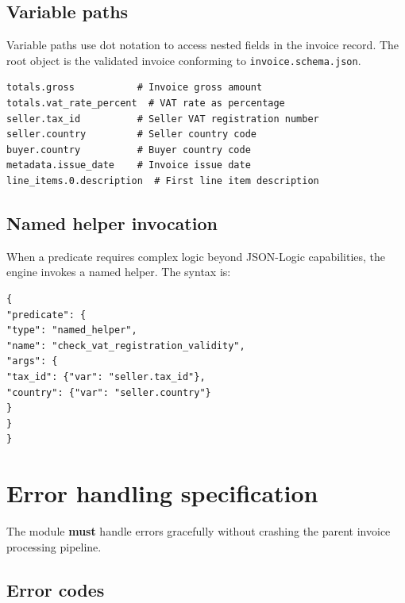 \documentclass[11pt,a4paper,twoside]{report}
\begin{document}
\subsection{Variable paths}

Variable paths use dot notation to access nested fields in the invoice record.
The root object is the validated invoice conforming to
\texttt{invoice.schema.json}.

\begin{lstlisting}[basicstyle=\ttfamily\small,caption={Example variable paths for invoice data.}]
totals.gross           # Invoice gross amount
totals.vat_rate_percent  # VAT rate as percentage
seller.tax_id          # Seller VAT registration number
seller.country         # Seller country code
buyer.country          # Buyer country code
metadata.issue_date    # Invoice issue date
line_items.0.description  # First line item description
\end{lstlisting}

\subsection{Named helper invocation}

When a predicate requires complex logic beyond JSON-Logic capabilities,
the engine invokes a named helper. The syntax is:

\begin{lstlisting}[basicstyle=\ttfamily\small,caption={Named helper invocation in rule predicate.}]
{
"predicate": {
"type": "named_helper",
"name": "check_vat_registration_validity",
"args": {
"tax_id": {"var": "seller.tax_id"},
"country": {"var": "seller.country"}
}
}
}
\end{lstlisting}

\section{Error handling specification}

The module \textbf{must} handle errors gracefully without crashing the
parent invoice processing pipeline.

\subsection{Error codes}
\end{document}

